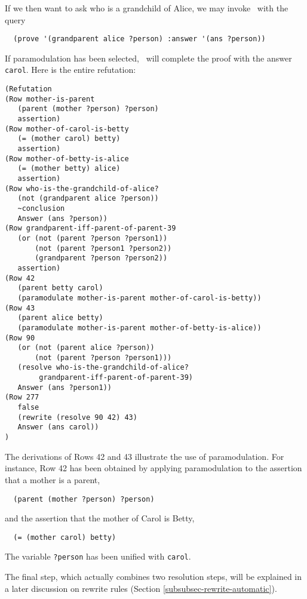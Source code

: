 If we then want to ask who is a grandchild of Alice, we may invoke
\snark\  with the query
\begin{verbatim}
  (prove '(grandparent alice ?person) :answer '(ans ?person))
\end{verbatim}

If paramodulation has been selected, \snark\  will complete the proof
with the answer {\tt carol}.  Here is the entire refutation:
\begin{verbatim}
(Refutation
(Row mother-is-parent
   (parent (mother ?person) ?person)
   assertion)
(Row mother-of-carol-is-betty
   (= (mother carol) betty)
   assertion)
(Row mother-of-betty-is-alice
   (= (mother betty) alice)
   assertion)
(Row who-is-the-grandchild-of-alice?
   (not (grandparent alice ?person))
   ~conclusion
   Answer (ans ?person))
(Row grandparent-iff-parent-of-parent-39
   (or (not (parent ?person ?person1))
       (not (parent ?person1 ?person2))
       (grandparent ?person ?person2))
   assertion)
(Row 42
   (parent betty carol)
   (paramodulate mother-is-parent mother-of-carol-is-betty))
(Row 43
   (parent alice betty)
   (paramodulate mother-is-parent mother-of-betty-is-alice))
(Row 90
   (or (not (parent alice ?person))
       (not (parent ?person ?person1)))
   (resolve who-is-the-grandchild-of-alice?
	    grandparent-iff-parent-of-parent-39)
   Answer (ans ?person1))
(Row 277
   false
   (rewrite (resolve 90 42) 43)
   Answer (ans carol))
)
\end{verbatim}
The derivations of Rows 42 and 43 illustrate the use of
paramodulation.  For instance, Row 42 has been obtained by applying
paramodulation to the assertion that a mother is a parent,
\begin{verbatim}
  (parent (mother ?person) ?person)
\end{verbatim}
and the assertion that the mother of Carol is Betty,
\begin{verbatim}
  (= (mother carol) betty)
\end{verbatim}
The variable {\tt ?person} has been unified with {\tt carol}.

The final step, which actually combines two
resolution steps, will be explained in a later discussion on rewrite
rules (Section \ref{subsubsec-rewrite-automatic}).


